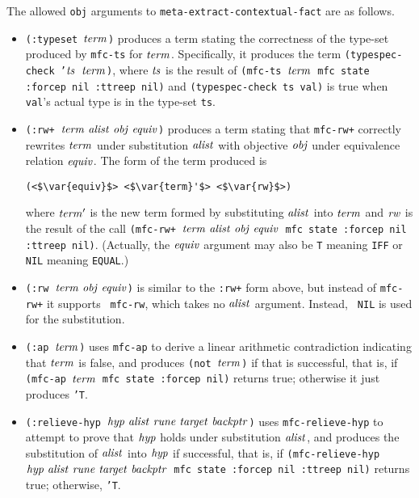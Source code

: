 The allowed {\tt obj} arguments to {\tt meta-extract-contextual-fact} are as follows.

\begin{itemize}

\item {\tt (:typeset $\mathit{term}$)} produces a term stating the correctness of
    the type-set produced by {\tt mfc-ts} for $\mathit{term}$.  Specifically, it produces the term
    {\tt (typespec-check '$\mathit{ts}$ $\mathit{term}$)}, where $\mathit{ts}$ is
    the result of {\tt (mfc-ts $\mathit{term}$ mfc state :forcep nil :ttreep nil)} and
    {\tt (typespec-check ts val)} is true when {\tt val}'s actual type is in the type-set {\tt ts}.

  \item {\tt (:rw+ $\var{term}\ \var{alist}\ \var{obj}\ \var{equiv}$)}
    produces a term stating that {\tt mfc-rw+} correctly rewrites
    $\mathit{term}$ under substitution $\mathit{alist}$ with objective
    $\mathit{obj}$ under equivalence relation $\mathit{equiv}$.  The form of the term produced is
  \begin{lstlisting}[basicstyle=\linespread{0.4}\normalsize\ttfamily]
    (<$\var{equiv}$> <$\var{term}'$> <$\var{rw}$>)
  \end{lstlisting}
  where $\mathit{term}'$ is the new term formed by substituting
  $\mathit{alist}$ into $\mathit{term}$ and $\mathit{rw}$ is the result of the call
  {\tt (mfc-rw+ $\var{term}\ \var{alist}\ \var{obj}\ \var{equiv}$ mfc state :forcep nil :ttreep nil)}.
  (Actually, the $\mathit{equiv}$ argument may also be {\tt T} meaning
  {\tt IFF} or {\tt NIL} meaning {\tt EQUAL}.)

\item {\tt (:rw $\var{term}\ \var{obj}\ \var{equiv}$)} is similar to the
  {\tt :rw+} form above, but instead of {\tt mfc-rw+} it supports {\tt
    mfc-rw}, which takes no $\mathit{alist}$ argument.  Instead, {\tt
    NIL} is used for the substitution.

\item {\tt (:ap $\mathit{term}$)} uses {\tt mfc-ap} to derive a linear
  arithmetic contradiction indicating that $\mathit{term}$ is false, and
  produces {\tt (not $\mathit{term}$)} if that is successful, that is, if
  {\tt (mfc-ap $\mathit{term}$ mfc state :forcep nil)} returns true;
  otherwise it just produces {\tt 'T}.

\item {\tt (:relieve-hyp $\var{hyp}\ \var{alist}\ \var{rune}\
    \var{target}\ \var{backptr}$)} uses {\tt mfc-relieve-hyp} to
  attempt to prove that $\mathit{hyp}$ holds under substitution
  $\mathit{alist}$, and produces the substitution of
  $\mathit{alist}$ into $\mathit{hyp}$ if successful, that is, if
  {\tt (mfc-relieve-hyp $\var{hyp}\ \var{alist}\ \var{rune}\
    \var{target}\ \var{backptr}$ mfc state :forcep nil :ttreep nil)}
  returns true; otherwise, {\tt 'T}.

\end{itemize}

